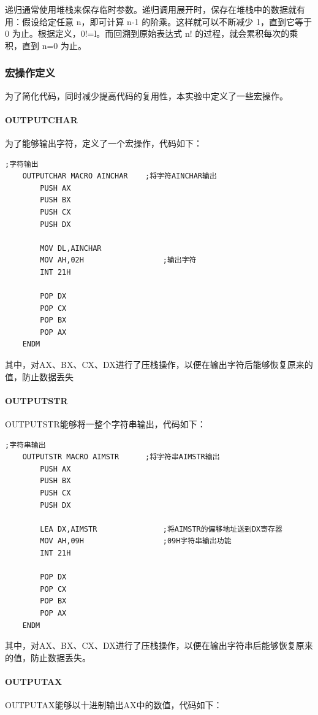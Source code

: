 \documentclass[UTF8,12pt]{article}
\begin{document}
递归通常使用堆栈来保存临时参数。递归调用展开时，保存在堆栈中的数据就有用：假设给定任意 n，即可计算 n-1 的阶乘。这样就可以不断减少 1，直到它等于 0 为止。根据定义，0!=l。而回溯到原始表达式 n! 的过程，就会累积每次的乘积，直到 n=0 为止。

\subsubsection{宏操作定义}
为了简化代码，同时减少提高代码的复用性，本实验中定义了一些宏操作。

\paragraph{OUTPUTCHAR}
为了能够输出字符，定义了一个宏操作，代码如下：

\begin{lstlisting}[title=OUTPUTCHAR,frame=shadowbox]
    ;字符输出
    OUTPUTCHAR MACRO AINCHAR	;将字符AINCHAR输出
        PUSH AX
        PUSH BX
        PUSH CX
        PUSH DX
            
        MOV DL,AINCHAR
        MOV AH,02H					;输出字符
        INT 21H
            
        POP DX
        POP CX
        POP BX
        POP AX
    ENDM
\end{lstlisting}

其中，对AX、BX、CX、DX进行了压栈操作，以便在输出字符后能够恢复原来的值，防止数据丢失

\paragraph{OUTPUTSTR}
OUTPUTSTR能够将一整个字符串输出，代码如下：

\begin{lstlisting}[title=OUTPUTSTR,frame=shadowbox]
    ;字符串输出
    OUTPUTSTR MACRO AIMSTR		;将字符串AIMSTR输出
        PUSH AX
        PUSH BX
        PUSH CX
        PUSH DX
            
        LEA DX,AIMSTR				;将AIMSTR的偏移地址送到DX寄存器
        MOV AH,09H					;09H字符串输出功能
        INT 21H
            
        POP DX
        POP CX
        POP BX
        POP AX
    ENDM
\end{lstlisting}

其中，对AX、BX、CX、DX进行了压栈操作，以便在输出字符串后能够恢复原来的值，防止数据丢失。

\paragraph{OUTPUTAX}
OUTPUTAX能够以十进制输出AX中的数值，代码如下：
\end{document}
